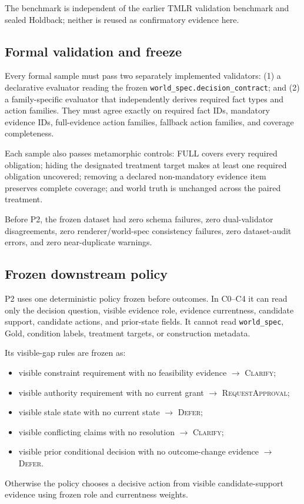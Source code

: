 The benchmark is independent of the earlier TMLR validation benchmark and sealed Holdback;
neither is reused as confirmatory evidence here.

\subsection{Formal validation and freeze}

Every formal sample must pass two separately implemented validators:
(1) a declarative evaluator reading the frozen \texttt{world\_spec.decision\_contract};
and (2) a family-specific evaluator that independently derives required fact types and
action families. They must agree exactly on required fact IDs, mandatory evidence IDs,
full-evidence action families, fallback action families, and coverage completeness.

Each sample also passes metamorphic controls:
FULL covers every required obligation; hiding the designated treatment target makes at
least one required obligation uncovered; removing a declared non-mandatory evidence item
preserves complete coverage; and world truth is unchanged across the paired treatment.

Before P2, the frozen dataset had zero schema failures, zero dual-validator disagreements,
zero renderer/world-spec consistency failures, zero dataset-audit errors, and zero
near-duplicate warnings.

\subsection{Frozen downstream policy}

P2 uses one deterministic policy frozen before outcomes. In C0--C4 it can read only the
decision question, visible evidence role, evidence currentness, candidate support,
candidate actions, and prior-state fields. It cannot read \texttt{world\_spec}, Gold,
condition labels, treatment targets, or construction metadata.

Its visible-gap rules are frozen as:
\begin{itemize}
  \item visible constraint requirement with no feasibility evidence $\rightarrow$ \textsc{Clarify};
  \item visible authority requirement with no current grant $\rightarrow$ \textsc{RequestApproval};
  \item visible stale state with no current state $\rightarrow$ \textsc{Defer};
  \item visible conflicting claims with no resolution $\rightarrow$ \textsc{Clarify};
  \item visible prior conditional decision with no outcome-change evidence $\rightarrow$ \textsc{Defer}.
\end{itemize}
Otherwise the policy chooses a decisive action from visible candidate-support evidence
using frozen role and currentness weights.

